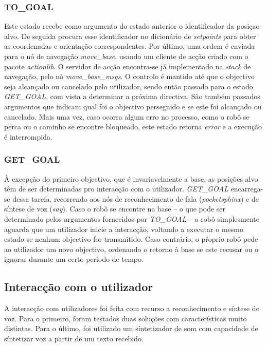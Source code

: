 \documentclass[journal]{IEEEtran}
\begin{document}
\subsubsection{TO\_GOAL} Este estado recebe como argumento do estado anterior o identificador da posiçao-alvo. De seguida procura esse identificador no dicionário de \textit{setpoints} para obter as coordenadas e orientação correspondentes. Por último, uma ordem é enviada para o nó de navegação \textit{move\_base}, usando um cliente de acção criado com o pacote \textit{actionlib}. O servidor de acção encontra-se já implementado na \textit{stack} de navegação, pelo nó \textit{move\_base\_msgs}. O controlo é mantido até que o objectivo seja alcançado ou cancelado pelo utilizador, sendo então passado para o estado \textit{GET\_GOAL}, com vista a determinar a próxima directiva. São também passados argumentos que indicam qual foi o objectivo perseguido e se este foi alcançado ou cancelado. Mais uma vez, caso ocorra algum erro no processo, como o robô se perca ou o caminho se encontre bloqueado, este estado retorna \textit{error} e a execução é interrompida.

\subsubsection{GET\_GOAL} À excepção do primeiro objectivo, que é invariavelmente a base, as posições alvo têm de ser determinadas pro interacção com o utilizador. \textit{GET\_GOAL} encarrega-se dessa tarefa, recorrendo aos nós de reconhecimento de fala (\textit{pocketsphinx}) e de síntese de voz (\textit{say}). Caso o robô se encontre na base -- o que pode ser determinado pelos argumentos fornecidos por \textit{TO\_GOAL} -- o robô simplesmente aguarda que um utilizador inicie a interacção, voltando a executar o mesmo estado se nenhum objectivo for transmitido. Caso contrário, o pŕoprio robô pede ao utilizador um novo objectivo, ordenando o retorno à base se este recusar ou o ignorar durante um certo período de tempo.


\subsection{Interacção com o utilizador}

A interacção com utilizadores foi feita com recurso a reconhecimento e síntese de voz. Para o primeiro, foram testados duas soluções com características muito distintas. Para o último, foi utilizado um síntetizador de som com capacidade de síntetizar voz a partir de um texto recebido.
\end{document}

